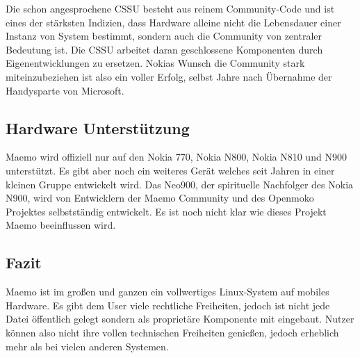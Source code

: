 Die schon angesprochene CSSU besteht aus reinem Community-Code und ist eines der stärksten Indizien, dass Hardware alleine nicht die Lebensdauer einer Instanz von System bestimmt, sondern auch die Community von zentraler Bedeutung ist. Die CSSU arbeitet daran geschlossene Komponenten durch Eigenentwicklungen zu ersetzen. Nokias Wunsch die Community stark miteinzubeziehen ist also ein voller Erfolg, selbst Jahre nach Übernahme der Handysparte von Microsoft\thinspace\cite{online:nokia-microsoft}.
\newline

\subsection{Hardware Unterstützung}
Maemo wird offiziell nur auf den Nokia 770\thinspace\cite{online:maemo1-770}, Nokia N800\thinspace\cite{online:n800-specs}, Nokia N810\thinspace\cite{online:n810-specs} und N900\thinspace\cite{online:n900-specs} unterstützt. Es gibt aber noch ein weiteres Gerät welches seit Jahren in einer kleinen Gruppe entwickelt wird. Das Neo900, der spirituelle Nachfolger des Nokia N900\thinspace\cite{online:maemo-neo900}, wird von Entwicklern der Maemo Community und des Openmoko Projektes selbstständig entwickelt\thinspace\cite{online:maemo-neo900team}. Es ist noch nicht klar wie dieses Projekt Maemo beeinflussen wird.
\newline

\subsection{Fazit}
Maemo ist im großen und ganzen ein vollwertiges Linux-System auf mobiles Hardware. Es gibt dem User viele rechtliche Freiheiten, jedoch ist nicht jede Datei öffentlich gelegt sondern als proprietäre Komponente mit eingebaut. Nutzer können also nicht ihre vollen technischen Freiheiten genießen, jedoch erheblich mehr als bei vielen anderen Systemen.